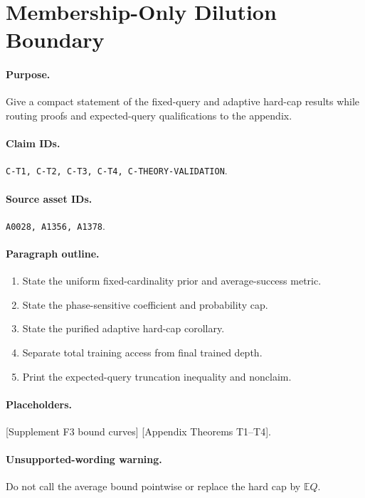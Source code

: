 \section{Membership-Only Dilution Boundary}

\paragraph{Purpose.}
Give a compact statement of the fixed-query and adaptive hard-cap results while
routing proofs and expected-query qualifications to the appendix.

\paragraph{Claim IDs.}
\texttt{C-T1, C-T2, C-T3, C-T4, C-THEORY-VALIDATION}.

\paragraph{Source asset IDs.}
\texttt{A0028, A1356, A1378}.

\paragraph{Paragraph outline.}
\begin{enumerate}
  \item State the uniform fixed-cardinality prior and average-success metric.
  \item State the phase-sensitive coefficient and probability cap.
  \item State the purified adaptive hard-cap corollary.
  \item Separate total training access from final trained depth.
  \item Print the expected-query truncation inequality and nonclaim.
\end{enumerate}

\paragraph{Placeholders.}
[Supplement F3 bound curves] [Appendix Theorems T1--T4].

\paragraph{Unsupported-wording warning.}
Do not call the average bound pointwise or replace the hard cap by $\mathbb E Q$.
